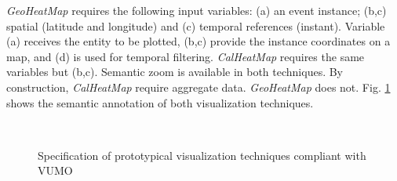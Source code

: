 \documentclass[]{interact}
\theoremstyle{plain}%
\theoremstyle{definition}
\theoremstyle{remark}
\theoremstyle{definition}
\begin{document}
\textit{GeoHeatMap} requires the following input variables: (a) an event instance; (b,c) spatial (latitude and longitude) and (c) temporal references (instant). Variable (a) receives the entity to be plotted, (b,c) provide the instance coordinates on a map, and (d) is used for temporal filtering. \textit{CalHeatMap} requires the same variables but (b,c). Semantic zoom is available in both techniques. By construction, \textit{CalHeatMap} require aggregate data. \textit{GeoHeatMap} does not. Fig. \ref{fig:visualizations_spec} shows the semantic annotation of both visualization techniques.

\begin{figure}
\centering
{}
\\
\caption{Specification of prototypical visualization techniques compliant with VUMO}
\label{fig:visualizations_spec}
\end{figure}

\end{document}
